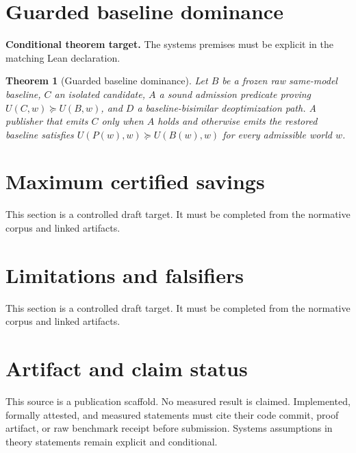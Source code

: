 \documentclass[11pt]{article}
\newtheorem{theorem}{Theorem}
\begin{document}
\section{Guarded baseline dominance}
\textbf{Conditional theorem target.} The systems premises must be explicit in the matching Lean declaration.
\begin{theorem}[Guarded baseline dominance]
Let $B$ be a frozen raw same-model baseline, $C$ an isolated candidate, $A$ a sound admission predicate proving $U(C,w)\succeq U(B,w)$, and $D$ a baseline-bisimilar deoptimization path. A publisher that emits $C$ only when $A$ holds and otherwise emits the restored baseline satisfies $U(P(w),w)\succeq U(B(w),w)$ for every admissible world $w$.
\end{theorem}

\section{Maximum certified savings}
This section is a controlled draft target. It must be completed from the normative corpus and linked artifacts.

\section{Limitations and falsifiers}
This section is a controlled draft target. It must be completed from the normative corpus and linked artifacts.

\section*{Artifact and claim status}
This source is a publication scaffold. No measured result is claimed. Implemented,
formally attested, and measured statements must cite their code commit, proof
artifact, or raw benchmark receipt before submission. Systems assumptions in
theory statements remain explicit and conditional.
\end{document}
